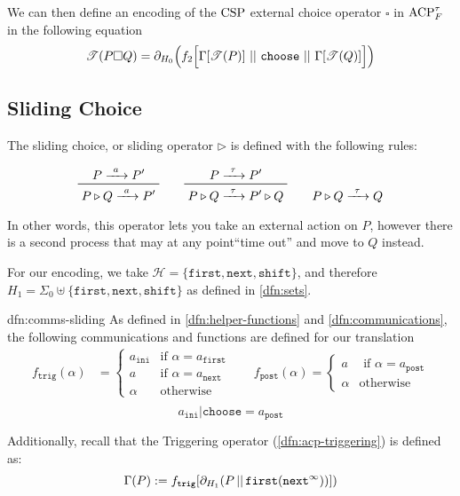 \documentclass[../hons_project.tex]{subfiles}
\begin{document}
We can then define an encoding of the $\csp$ external choice operator $\square$ in $\acptf$ in the following equation
\[\trans{P \square Q} = \partial_{H_{0}}\Bigl(f_{2}\Bigl[\Gamma[\trans{P}]\, \merge \,\mathtt{choose}\, \merge \,\Gamma[\trans{Q}]\Bigl]\Bigr)\]

\subsection{Sliding Choice}\label{ssec:sliding-choice}
The sliding choice, or sliding operator $\triangleright$ is defined with the following rules:

\[\prftree{P \prightarrow{a} P'}{P \triangleright Q \prightarrow{a} P'} \qquad \prftree{P \prightarrow{\tau} P'}{P \triangleright Q \prightarrow{\tau} P' \triangleright Q} \qquad P \triangleright Q \prightarrow{\tau} Q\]

In other words, this operator lets you take an external action on $P$, however there is a second process that may at any point``time out'' and move to $Q$ instead.

For our encoding, we take $\mathscr{H} = \{\mathtt{first}, \mathtt{next}, \mathtt{shift}\}$, and therefore $H_{1} = \Sigma_{0} \uplus \{\mathtt{first}, \mathtt{next}, \mathtt{shift}\}$ as defined in \ref{dfn:sets}.

\begin{dfn}{dfn:comms-sliding}{}
	As defined in \ref{dfn:helper-functions} and \ref{dfn:communications}, the following communications and functions are defined for our translation
	\begin{align*}
		f_{\mathtt{trig}}(\alpha) & = \begin{cases}
			                              a_{\mathtt{ini}} & \text{if } \alpha = a_{\mathtt{first}} \\
			                              a                & \text{if } \alpha = a_{\mathtt{next}}  \\
			                              \alpha           & \text{otherwise}
		                              \end{cases} \quad
		                          & f_{\mathtt{post}}(\alpha)             = \begin{cases}
			                                                                    a      & \text{ if } \alpha = a_{\mathtt{post}} \\
			                                                                    \alpha & \text{otherwise}
		                                                                    \end{cases} \\
	\end{align*}
	\[a_{\mathtt{ini}} | \mathtt{choose} = a_{\mathtt{post}}\]

	\longrule{0.08ex}

	Additionally, recall that the Triggering operator (\ref{dfn:acp-triggering}) is defined as:
	\[\Gamma(P) := f_{\mathtt{trig}}[\partial_{H_{1}}(P \merge \mathtt{first}(\mathtt{next}^{\infty}))])\]
\end{dfn}
\end{document}
